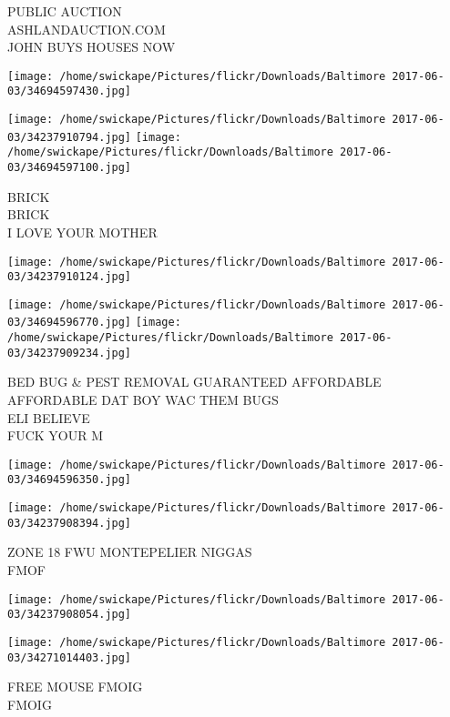\documentclass[10pt,letterpaper]{article}
\begin{document}
PUBLIC AUCTION\\
ASHLANDAUCTION.COM\\
JOHN BUYS HOUSES NOW\\
\pagebreak

\texttt{[image: /home/swickape/Pictures/flickr/Downloads/Baltimore 2017-06-03/34694597430.jpg]}

\vspace{0.25in}
\texttt{[image: /home/swickape/Pictures/flickr/Downloads/Baltimore 2017-06-03/34237910794.jpg]}
\texttt{[image: /home/swickape/Pictures/flickr/Downloads/Baltimore 2017-06-03/34694597100.jpg]}

BRICK\\
BRICK\\
I LOVE YOUR MOTHER\\
\pagebreak

\texttt{[image: /home/swickape/Pictures/flickr/Downloads/Baltimore 2017-06-03/34237910124.jpg]}

\vspace{0.25in}
\texttt{[image: /home/swickape/Pictures/flickr/Downloads/Baltimore 2017-06-03/34694596770.jpg]}
\texttt{[image: /home/swickape/Pictures/flickr/Downloads/Baltimore 2017-06-03/34237909234.jpg]}

BED BUG \& PEST REMOVAL GUARANTEED AFFORDABLE AFFORDABLE DAT BOY WAC THEM BUGS\\
ELI BELIEVE\\
FUCK YOUR M\\
\pagebreak

\texttt{[image: /home/swickape/Pictures/flickr/Downloads/Baltimore 2017-06-03/34694596350.jpg]}

\vspace{0.25in}
\texttt{[image: /home/swickape/Pictures/flickr/Downloads/Baltimore 2017-06-03/34237908394.jpg]}

ZONE 18 FWU MONTEPELIER NIGGAS\\
FMOF\\
\pagebreak

\texttt{[image: /home/swickape/Pictures/flickr/Downloads/Baltimore 2017-06-03/34237908054.jpg]}

\vspace{0.25in}
\texttt{[image: /home/swickape/Pictures/flickr/Downloads/Baltimore 2017-06-03/34271014403.jpg]}

FREE MOUSE FMOIG\\
FMOIG\\
\pagebreak
\end{document}
